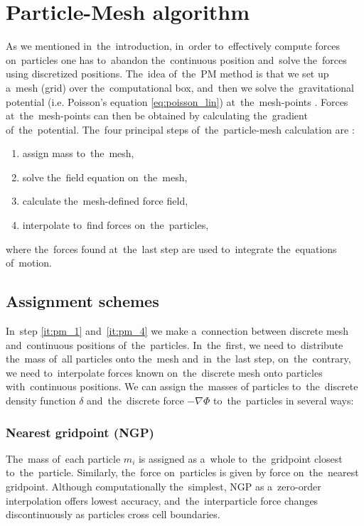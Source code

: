 \section{Particle-Mesh algorithm}
\label{sec:PM}
As we mentioned in~the~introduction, in~order to~effectively compute forces on~particles one has to~abandon the~continuous position and~solve the~forces using discretized positions. The~idea of~the~PM method is that we set up a~mesh (grid) over the~computational box, and~then we solve the~gravitational potential (i.e. Poisson’s equation \eqref{eq:poisson_lin}) at~the~mesh-points \parencite{n_body_Lindholm}. Forces at~the~mesh-points can then be obtained by calculating the~gradient of~the~potential. The~four principal steps of~the~particle-mesh calculation are \parencite{Hockney:1988:CSU:62815}:
\begin{enumerate}
    \item assign mass to~the~mesh,
    \label{it:pm_1}
    \item solve the~field equation on~the~mesh,
    \label{it:pm_2}
    \item calculate the~mesh-defined force field,
    \label{it:pm_3}
    \item interpolate to~find forces on~the~particles,
    \label{it:pm_4}
\end{enumerate}
where the~forces found at~the~last step are used to~integrate the~equations of~motion.
\subsection{Assignment schemes}
In~step \ref{it:pm_1} and~\ref{it:pm_4} we make a~connection between discrete mesh and~continuous positions of~the~particles. In~the~first, we need to~distribute the~mass of~all particles onto the~mesh and~in~the~last step, on~the~contrary, we need to~interpolate forces known on~the~discrete mesh onto particles with~continuous positions. We can assign the~masses of particles to~the~discrete density function $\delta$ and~the~discrete force $-\nabla\Phi$ to~the~particles in several ways:

\subsubsection{Nearest gridpoint (NGP)}
The~mass of~each particle $m_i$ is assigned as a~whole to~the~gridpoint closest to~the~particle. Similarly, the~force on~particles is given by force on~the~nearest gridpoint. Although computationally the~simplest, NGP as a~zero-order interpolation offers lowest accuracy, and~the~interparticle force changes discontinuously as particles cross cell boundaries.

